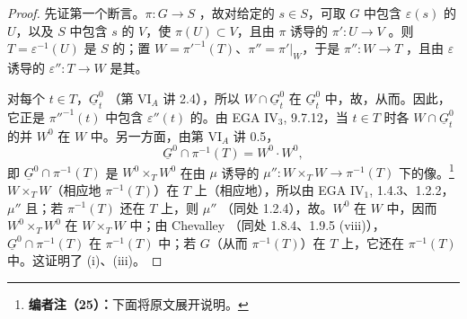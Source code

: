 \begin{proof}
先证第一个断言。$\pi:G\to S$ ，故对给定的 $s\in S$，可取 $G$ 中包含 $\varepsilon(s)$ 的 $U$，以及 $S$ 中包含 $s$ 的 $V$，使 $\pi(U)\subset V$，且由 $\pi$ 诱导的 $\pi':U\to V$ 。则 $T=\varepsilon^{-1}(U)$ 是 $S$ 的；置 $W=\pi'^{-1}(T)$、$\pi''=\pi'|_W$，于是 $\pi'':W\to T$ ，且由 $\varepsilon$ 诱导的 $\varepsilon'':T\to W$ 是其。

对每个 $t\in T$，$\underline G_t^0$ （第 VI$_A$ 讲 2.4），所以 $W\cap\underline G_t^0$ 在 $\underline G_t^0$ 中，故，从而。因此，它正是 $\pi''^{-1}(t)$ 中包含 $\varepsilon''(t)$ 的。由 EGA IV$_3$, 9.7.12，当 $t\in T$ 时各 $W\cap\underline G_t^0$ 的并 $W^0$ 在 $W$ 中。另一方面，由第 VI$_A$ 讲 0.5，
\[
\underline G^0\cap\pi^{-1}(T)=W^0\cdot W^0,
\]
即 $\underline G^0\cap\pi^{-1}(T)$ 是 $W^0\times_TW^0$ 在由 $\mu$ 诱导的 $\mu'':W\times_TW\to\pi^{-1}(T)$ 下的像。\footnote{\textbf{编者注（25）：}下面将原文展开说明。}$W\times_TW$（相应地 $\pi^{-1}(T)$）在 $T$ 上（相应地），所以由 EGA IV$_1$, 1.4.3、1.2.2，$\mu''$ 且；若 $\pi^{-1}(T)$ 还在 $T$ 上，则 $\mu''$ （同处 1.2.4），故。$W^0$ 在 $W$ 中，因而 $W^0\times_TW^0$ 在 $W\times_TW$ 中；由 Chevalley （同处 1.8.4、1.9.5 (viii)），$\underline G^0\cap\pi^{-1}(T)$ 在 $\pi^{-1}(T)$ 中；若 $G$（从而 $\pi^{-1}(T)$）在 $T$ 上，它还在 $\pi^{-1}(T)$ 中。这证明了 (i)、(iii)。


\end{proof}
